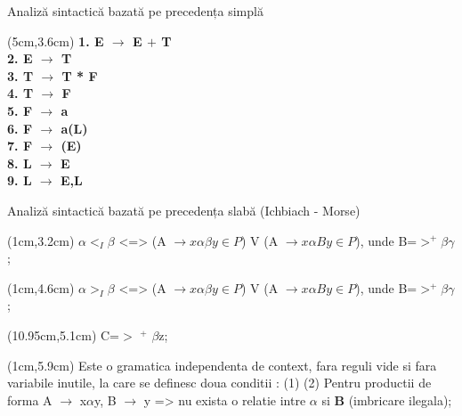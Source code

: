 \documentclass[pdf]{beamer}
\begin{document}
\begin{frame}{Analiză sintactică bazată pe precedența simplă}    
    \begin{textblock*}{14cm}(5cm,3.6cm)
    \textbf{1. E $\rightarrow$ E $+$ T}\\
    \textbf{2. E $\to$ T}\\
    \textbf{3. T $\to$ T * F}\\
    \textbf{4. T $\to$ F}\\
    \textbf{5. F $\to$ a}\\
    \textbf{6. F $\to$ a(L)}\\
    \textbf{7. F $\to$ (E)}\\
    \textbf{8. L $\to$ E}\\
    \textbf{9. L $\to$ E,L}
    \end{textblock*}
\end{frame}



\begin{frame}
{Analiză sintactică bazată pe precedența slabă (Ichbiach - Morse)}

\begin{textblock*}{14.8cm}(1cm,3.2cm)
\color{black}{ $\beta \in \Sigma$ }
\color{black}{ (1)} \color{red} $\alpha <_{I} \beta$ \color{black} <=> \color{blue} (A $\rightarrow x \alpha \beta y \in P$) V (A $\rightarrow  x  \alpha By \in P$), unde B=$>^+\beta\gamma${;}  
\end{textblock*}

\begin{textblock*}{14.8cm}(1cm,4.6cm)
\color{black}{ (2)} \color{red} $\alpha >_{I} \beta$ \color{black} <=> \color{blue} (A $\rightarrow x \alpha \beta y \in P$) V (A $\rightarrow x \alpha By \in P$), unde B=$>^+\beta\gamma${;}  
\end{textblock*}

\begin{textblock*}{14.8cm}(10.95cm,5.1cm)
 C=$>$ $^+$ $\beta$z; 
\end{textblock*}

\begin{textblock*}{16.8cm}(1cm,5.9cm)
\color{black} Este o gramatica independenta de context, fara reguli vide si fara  variabile inutile, la care se definesc doua conditii :
(1) 
\color{black} (2) Pentru productii de forma \color{blue} A $\rightarrow$ x$\alpha$y, B $\rightarrow$ y \color{black} =>  nu exista o relatie intre \color{red} {$\alpha$} \color{black} si \color{red}\textbf B
 \color{red} {(imbricare ilegala)}\color{black};
\end{textblock*}
\end{frame}
\end{document}
